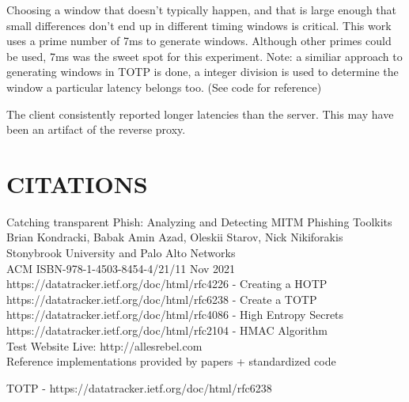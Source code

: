 \documentclass[a4paper, 11pt]{article} 				%
\begin{document}
Choosing a window that doesn't typically happen, and that is large enough that small differences don't end up in different timing windows is critical. This work uses a prime number of 7ms to generate windows. Although other primes could be used, 7ms was the sweet spot for this experiment. Note: a similiar approach to generating windows in TOTP is done, a integer division is used to determine the window a particular latency belongs too. (See code for reference)

The client consistently reported longer latencies than the server. This may have been an artifact of the reverse proxy.

\section{CITATIONS } 	%

\noindent
[1]Catching transparent Phish: Analyzing and Detecting MITM Phishing Toolkits\\
\noindent 
Brian Kondracki, Babak Amin Azad, Oleskii Starov, Nick Nikiforakis\\
Stonybrook University and Palo Alto Networks\\ 
\noindent
ACM ISBN-978-1-4503-8454-4/21/11 Nov 2021\\

\noindent
[2]https://datatracker.ietf.org/doc/html/rfc4226 - Creating a HOTP\\

\noindent
[3]https://datatracker.ietf.org/doc/html/rfc6238 - Create a TOTP\\ 

\noindent
[4]https://datatracker.ietf.org/doc/html/rfc4086 - High Entropy Secrets\\

\noindent
[5]https://datatracker.ietf.org/doc/html/rfc2104 - HMAC Algorithm\\

\noindent
[6]Test Website Live: http://allesrebel.com\\ 

\noindent
Reference implementations provided by papers + standardized code

\noindent
[7]TOTP - https://datatracker.ietf.org/doc/html/rfc6238
\end{document}

